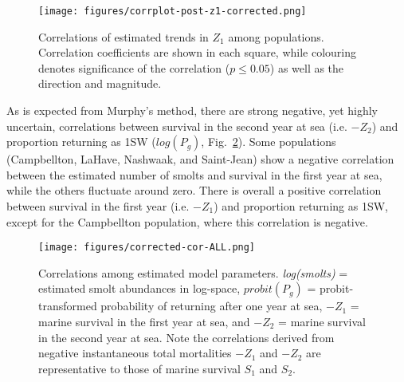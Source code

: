 \documentclass[12pt]{article}
\begin{document}
\begin{figure}[htbp] \centering
    \texttt{[image: figures/corrplot-post-z1-corrected.png]} \caption{
        Correlations of estimated trends in $Z_1$ among populations.
        Correlation coefficients are shown in each square, while colouring
        denotes significance of the correlation ($p \leq 0.05$) as well as the direction and magnitude.}
\label{fig:s1-corr}
\end{figure}

As is expected from Murphy's method, there are strong negative, yet highly uncertain, correlations
between survival in the second year at sea (i.e. $-Z_2$) and proportion returning
as 1SW ($log(P_g)$, Fig.~\ref{fig:cor-params}). Some populations (Campbellton,
LaHave, Nashwaak, and Saint-Jean) show a negative correlation between the
estimated number of smolts and survival in the first year at sea, while the
others fluctuate around zero. There is overall a positive correlation between
survival in the first year (i.e. $-Z_1$) and proportion returning as 1SW,
except for the Campbellton population, where this correlation is negative.


\begin{figure}[htbp] \centering
    \texttt{[image: figures/corrected-cor-ALL.png]}
    \caption{Correlations among estimated model parameters. \emph{log(smolts)} = estimated smolt abundances in log-space, $probit(P_g)$ = probit-transformed probability of
        returning after one year at sea, $-Z_1$ = marine survival in the first year at sea, and $-Z_2$ = marine survival in the second year at sea.
        Note the correlations derived from negative instantaneous total mortalities $-Z_1$ and $-Z_2$ are representative to those of marine survival $S_1$ and $S_2$.}
    \label{fig:cor-params}
\end{figure}
\end{document}
